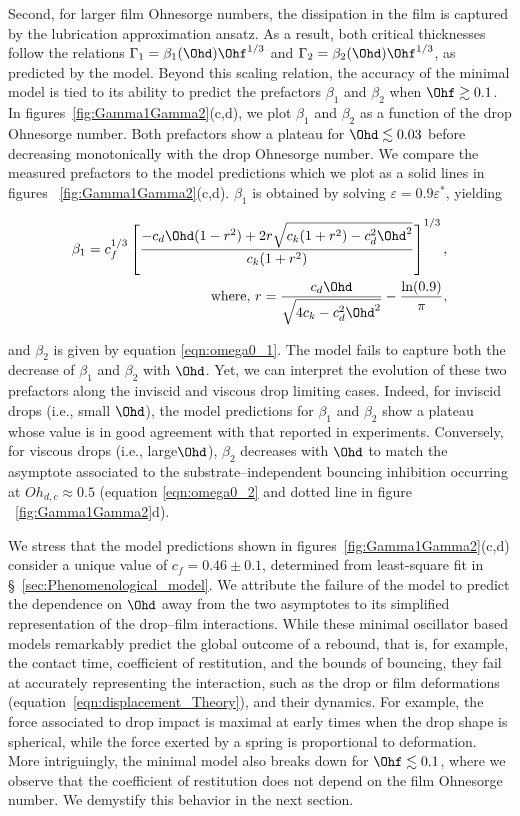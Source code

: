 Second, for larger film Ohnesorge numbers, the dissipation in the film is captured by the lubrication approximation ansatz. As a result, both critical thicknesses follow the relations $\Gamma_1 = \beta_1(\Ohd)\Ohf^{1/3}$ and $\Gamma_2 = \beta_2(\Ohd)\Ohf^{1/3}$, as predicted by the model. Beyond this scaling relation, the accuracy of the minimal model is tied to its ability to predict the prefactors $\beta_1$ and $\beta_2$ when $\Ohf \gtrsim 0.1$. In figures~\ref{fig:Gamma1Gamma2}(c,d), we plot $\beta_1$ and $\beta_2$ as a function of the drop Ohnesorge number. Both prefactors show a plateau for $\Ohd \lesssim 0.03$ before decreasing monotonically with the drop Ohnesorge number.
We compare the measured prefactors to the model predictions which we plot as a solid lines in figures ~\ref{fig:Gamma1Gamma2}(c,d). $\beta_1$ is obtained by solving $\varepsilon = 0.9\varepsilon^*$, yielding

\begin{align}
	\beta_{1} = c_{f}^{1/3} \left[ \dfrac{-c_{d} \Ohd (1 - r^{2}) + 2 r \sqrt{c_{k} (1 + r^{2}) - c_d^{2} \Ohd^{2}}}{c_{k} (1 + r^{2})} \right]^{1/3}, \label{alpha1}\\
	\text{where, } r = \dfrac{c_{d} \Ohd}{\sqrt{4 c_{k} - c_{d}^{2} \Ohd^{2}}} - \dfrac{\text{ln}(0.9)}{\pi},
\end{align}

\noindent and $\beta_2$ is given by equation \eqref{eqn:omega0_1}. The model fails to capture both the decrease of $\beta_1$ and $\beta_2$ with $\Ohd$. Yet, we can interpret the evolution of these two prefactors along the inviscid and viscous drop limiting cases. Indeed, for inviscid drops (i.e., small $\Ohd$), the model predictions for $\beta_1$ and $\beta_2$ show a plateau whose value is in good agreement with that reported in experiments. Conversely, for viscous drops (i.e., large$\Ohd$), $\beta_2$ decreases with $\Ohd$ to match the asymptote associated to the substrate--independent bouncing inhibition occurring at $Oh_{d,c} \approx 0.5$ (equation \eqref{eqn:omega0_2} and dotted line in figure ~\ref{fig:Gamma1Gamma2}d).

We stress that the model predictions shown in figures~\ref{fig:Gamma1Gamma2}(c,d) consider a unique value of $c_f = 0.46 \pm 0.1$, determined from least-square fit in \S~\ref{sec:Phenomenological_model}. We attribute the failure of the model to predict the dependence on $\Ohd$ away from the two asymptotes to its simplified representation of the drop--film interactions. While these minimal oscillator based models remarkably predict the global outcome of a rebound, that is, for example, the contact time, coefficient of restitution, and the bounds of bouncing, they fail at accurately representing the interaction, such as the drop or film deformations (equation~\eqref{eqn:displacement_Theory}), and their dynamics. For example, the force associated to drop impact is maximal at early times when the drop shape is spherical, while the force exerted by a spring is proportional to deformation. More intriguingly, the minimal model also breaks down for $\Ohf \lesssim 0.1$, where we observe that the coefficient of restitution does not depend on the film Ohnesorge number. We demystify this behavior in the next section. 

